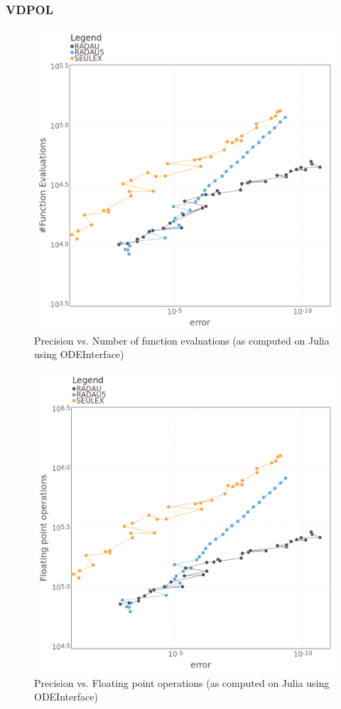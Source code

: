 \documentclass[notitlepage,12pt]{article}
\begin{document}
\subsubsection{VDPOL}
\begin{figure}[H]
\centering
\includegraphics[scale=0.4]{../ImagesAndPDFs/Plots/vdpolPrecisionTest.png}
\caption{Precision vs. Number of function evaluations (as computed on Julia using ODEInterface)}
\label{fig:vdpolJulia}
\end{figure}

\begin{figure}[H]
\centering
\includegraphics[scale=0.4]{../ImagesAndPDFs/Plots/vdpolPrecisionTestFlops.png}
\caption{Precision vs. Floating point operations (as computed on Julia using ODEInterface)}
\label{fig:vdpolJuliaFlops}
\end{figure}
\end{document}
